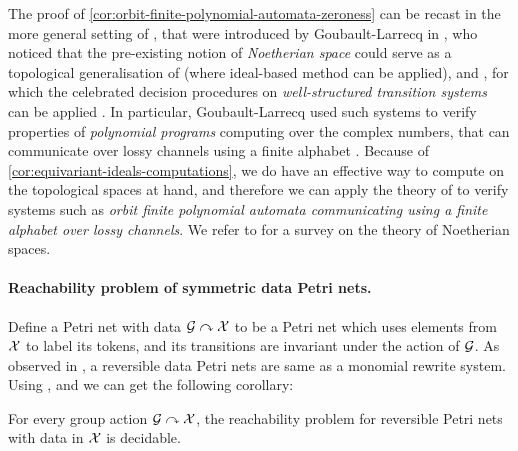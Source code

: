\begin{remark}
  \label{rem:topological-wsts}
  The proof of \cref{cor:orbit-finite-polynomial-automata-zeroness} can be
  recast in the more general setting of 
  , that were introduced by
  Goubault-Larrecq in \cite{JGL07}, who noticed that the pre-existing notion of
  \emph{Noetherian space} could serve as a topological generalisation of
   (where ideal-based method can be applied),
  and 
  , for which the celebrated decision procedures on
  \emph{well-structured transition systems} can be applied \cite{ABDU96}. In particular,
  Goubault-Larrecq used such systems to verify properties of \emph{polynomial
  programs} computing over the complex numbers, that can communicate over lossy
  channels using a finite alphabet \cite{JGL10}. 
  Because of \cref{cor:equivariant-ideals-computations}, we do have an 
  effective way to compute on the topological spaces at hand, 
  and therefore we can apply the theory of
   to verify systems
  such as \emph{orbit finite polynomial automata communicating using a finite alphabet
  over lossy channels}.
  We refer to \cite[Chapter 9]{JGL13} for a survey on the theory of 
  Noetherian spaces.
\end{remark}



\paragraph{Reachability problem of symmetric data Petri nets.}
Define a Petri net with data $\mathcal{G}\curvearrowright\mathcal{X}$ to be a Petri net which uses elements from $\mathcal{X}$ to label its tokens,
and its transitions are invariant under the action of $\mathcal{G}$.
As observed in \cite[Section 8]{GHOLAS24},
a reversible data Petri nets are same as a monomial rewrite system.
Using ,  and \cite[Theorem 64]{GHOLAS24} we can get the following corollary:
%
\begin{corollary}\label{cor:rev data VAS}
  For every  group action $\mathcal{G}\curvearrowright\mathcal{X}$,
  the reachability problem for reversible Petri nets with data in $\mathcal{X}$ is decidable.
\end{corollary}



